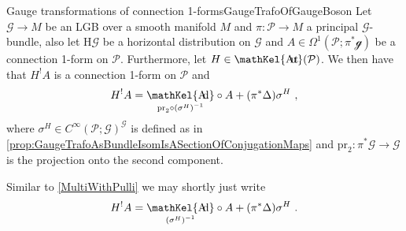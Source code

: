 \documentclass[reqno,a4paper,oneside]{amsart}
\theoremstyle{plain}
\theoremstyle{remark}
\theoremstyle{definition}
\DeclareMathOperator{\sAut}{\mathKel{A\mkern-5.5mu u\mkern-4mu t\mkern-1.5mu}}
\DeclareMathOperator{\sAd}{\mathKel{A\mkern-5.5mu d}}
\begin{document}
\begin{propositions}{Gauge transformations of connection 1-forms}{GaugeTrafoOfGaugeBoson}
Let $\mathcal{G} \to M$ be an LGB over a smooth manifold $M$ and $\pi\colon\mathcal{P} \to M$ a principal $\mathcal{G}$-bundle, also let $\mathrm{H}\mathcal{G}$ be a horizontal distribution on $\mathcal{G}$ and $A \in \Omega^1(\mathcal{P}; \pi^*\mathcal{g})$ be a connection 1-form on $\mathcal{P}$. Furthermore, let $H \in \sAut(\mathcal{P})$. We then have that $H^!A$ is a connection 1-form on $\mathcal{P}$ and
\begin{equation*}
H^!A
=
{\sAd_{\mathrm{pr}_2\circ\mleft(\sigma^H\mright)^{-1}}} \circ A 
	+ \mleft(\pi^*\Delta\mright)\sigma^H~,
\end{equation*}
where $\sigma^H \in C^\infty(\mathcal{P}; \mathcal{G})^{\mathcal{G}}$ is defined as in \ref{prop:GaugeTrafoAsBundleIsomIsASectionOfConjugationMaps} and $\mathrm{pr}_2\colon \pi^*\mathcal{G} \to \mathcal{G}$ is the projection onto the second component.

Similar to \ref{MultiWithPulli} we may shortly just write 
\begin{equation*}
H^!A
=
{\sAd_{\mleft(\sigma^H\mright)^{-1}}} \circ A
	+ \mleft(\pi^*\Delta\mright)\sigma^H~.
\end{equation*}
\end{propositions}
\end{document}
